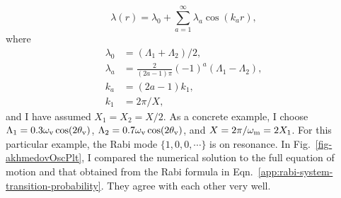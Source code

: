 \begin{equation}
\lambda(r) = \lambda_0 + \sum_{a=1}^{\infty} \lambda_a \cos\left( k_a  r \right),
\label{eq-castle-wall-fourier-expanded}
\end{equation}
where
\begin{align*}
\lambda_0 &= (\Lambda_1 + \Lambda_2)/2, \\
\lambda_a & = \frac{2}{(2a-1)\pi}  (-1)^a  \left( \Lambda_1 -  \Lambda_2 \right),\\
k_a &= (2a-1)k_1, \\
k_1 &= 2\pi/X,
\end{align*}
and I have assumed $X_1=X_2 = X/2$.
As a concrete example, I choose $\Lambda_1 = 0.3\omega_\mathrm v \cos (2\theta_\mathrm v)$, $\Lambda_2 = 0.7\omega_\mathrm v \cos (2\theta_\mathrm v)$, and $X=2\pi/\omega_\mathrm m=2X_1$. For this particular example, the Rabi mode $\{1, 0, 0, \cdots \}$ is on resonance. In Fig.~\ref{fig-akhmedovOscPlt}, I compared the numerical solution to the full equation of motion and that obtained from the Rabi formula in Eqn.~\eqref{app:rabi-system-transition-probability}. They agree with each other very well.







